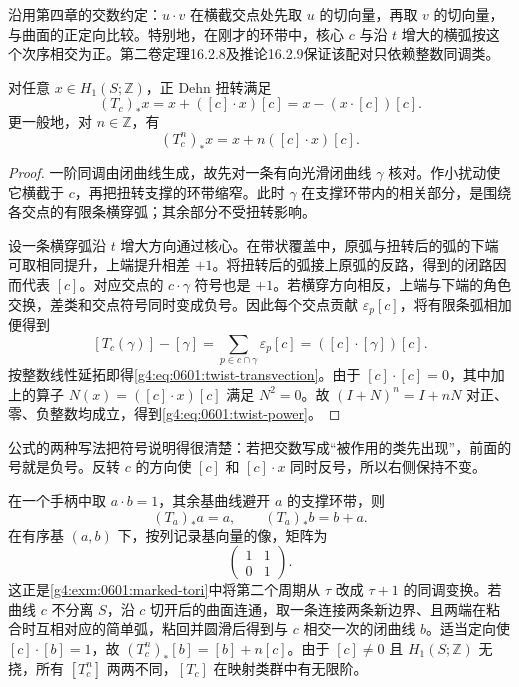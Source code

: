 沿用第四章的交数约定：\(u\cdot v\) 在横截交点处先取 \(u\) 的切向量，再取 \(v\) 的切向量，与曲面的正定向比较。特别地，在刚才的环带中，核心 \(c\) 与沿 \(t\) 增大的横弧按这个次序相交为正。第二卷定理16.2.8及推论16.2.9保证该配对只依赖整数同调类。

\begin{proposition}\label{g4:prop:0601:twist-homology}
	对任意 \(x\in H_1(S;\mathbb Z)\)，正 Dehn 扭转满足
	\begin{equation}\label{g4:eq:0601:twist-transvection}
		(T_c)_*x=x+([c]\cdot x)[c]
		=x-(x\cdot[c])[c].
	\end{equation}
	更一般地，对 \(n\in\mathbb Z\)，有
	\begin{equation}\label{g4:eq:0601:twist-power}
		(T_c^n)_*x=x+n([c]\cdot x)[c].
	\end{equation}
\end{proposition}
\begin{proof}
	一阶同调由闭曲线生成，故先对一条有向光滑闭曲线 \(\gamma\) 核对。作小扰动使它横截于 \(c\)，再把扭转支撑的环带缩窄。此时 \(\gamma\) 在支撑环带内的相关部分，是围绕各交点的有限条横穿弧；其余部分不受扭转影响。

	设一条横穿弧沿 \(t\) 增大方向通过核心。在带状覆盖中，原弧与扭转后的弧的下端可取相同提升，上端提升相差 \(+1\)。将扭转后的弧接上原弧的反路，得到的闭路因而代表 \([c]\)。对应交点的 \(c\cdot\gamma\) 符号也是 \(+1\)。若横穿方向相反，上端与下端的角色交换，差类和交点符号同时变成负号。因此每个交点贡献 \(\varepsilon_p[c]\)，将有限条弧相加便得到
	\[
		[T_c(\gamma)]-[\gamma]
		=\sum_{p\in c\cap\gamma}\varepsilon_p[c]
		=([c]\cdot[\gamma])[c].
	\]
	按整数线性延拓即得\eqref{g4:eq:0601:twist-transvection}。由于 \([c]\cdot[c]=0\)，其中加上的算子 \(N(x)=([c]\cdot x)[c]\) 满足 \(N^2=0\)。故 \((I+N)^n=I+nN\) 对正、零、负整数均成立，得到\eqref{g4:eq:0601:twist-power}。
\end{proof}

公式的两种写法把符号说明得很清楚：若把交数写成“被作用的类先出现”，前面的号就是负号。反转 \(c\) 的方向使 \([c]\) 和 \([c]\cdot x\) 同时反号，所以右侧保持不变。

\begin{example}\label{g4:exm:0601:twist-matrix}
	在一个手柄中取 \(a\cdot b=1\)，其余基曲线避开 \(a\) 的支撑环带，则
	\[
		(T_a)_*a=a,\qquad (T_a)_*b=b+a.
	\]
	在有序基 \((a,b)\) 下，按列记录基向量的像，矩阵为
	\[
		\begin{pmatrix}1&1\\0&1\end{pmatrix}.
	\]
	这正是\cref{g4:exm:0601:marked-tori}中将第二个周期从 \(\tau\) 改成 \(\tau+1\) 的同调变换。若曲线 \(c\) 不分离 \(S\)，沿 \(c\) 切开后的曲面连通，取一条连接两条新边界、且两端在粘合时互相对应的简单弧，粘回并圆滑后得到与 \(c\) 相交一次的闭曲线 \(b\)。适当定向使 \([c]\cdot[b]=1\)，故 \((T_c^n)_*[b]=[b]+n[c]\)。由于 \([c]\ne0\) 且 \(H_1(S;\mathbb Z)\) 无挠，所有 \([T_c^n]\) 两两不同，\([T_c]\) 在映射类群中有无限阶。
\end{example}

